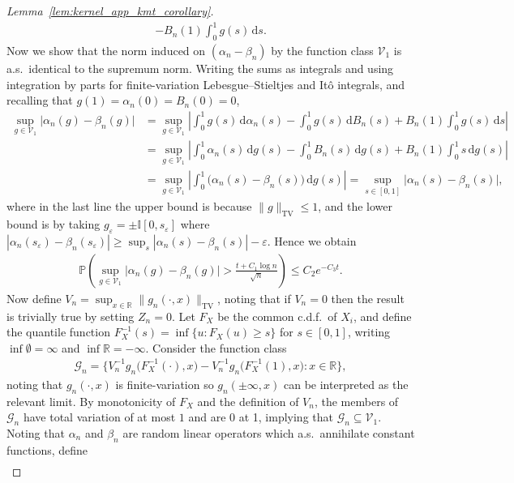 \documentclass[11pt,lof]{puthesis}
\renewcommand{\P}{\ensuremath{\mathbb{P}}}
\newcommand{\R}{\ensuremath{\mathbb{R}}}
\newcommand{\I}{\ensuremath{\mathbb{I}}}
\newcommand{\TV}{\mathrm{TV}}
\newcommand{\cG}{\ensuremath{\mathcal{G}}}
\newcommand{\cV}{\ensuremath{\mathcal{V}}}
\newcommand{\diff}[1]{\,\mathrm{d}#1}
\theoremstyle{break}
\theoremstyle{proof}
\newtheorem{proof}{Proof}
\begin{document}
\begin{proof}[Lemma~\ref{lem:kernel_app_kmt_corollary}]
\begin{align*}
- B_n(1) \int_0^1 g(s) \diff{s}.
\end{align*}
%
Now we show that the norm induced on
$(\alpha_n - \beta_n)$
by the function class $\cV_1$ is a.s.\ identical to the
supremum norm.
Writing the sums as integrals and using integration by parts
for finite-variation Lebesgue--Stieltjes and It\^o integrals,
and recalling that $g(1) = \alpha_n(0) = B_n(0) = 0$,
%
\begin{align*}
\sup_{g \in \cV_1}
\big|\alpha_n(g) - \beta_n(g)\big|
&=
\sup_{g \in \cV_1}
\left|
\int_0^1 g(s) \diff{\alpha_n(s)}
- \int_0^1 g(s) \diff{B_n(s)}
+ B_n(1) \int_0^1 g(s) \diff{s}
\right| \\
&=
\sup_{g \in \cV_1}
\left|
\int_0^1 \alpha_n(s) \diff{g(s)}
- \int_0^1 B_n(s) \diff{g(s)}
+ B_n(1) \int_0^1 s \diff{g(s)}
\right| \\
&=
\sup_{g \in \cV_1}
\left|
\int_0^1 \big(\alpha_n(s) - \beta_n(s)\big)
\diff{g(s)}
\right|
= \sup_{s \in [0,1]}
\big|
\alpha_n(s) - \beta_n(s)
\big|,
\end{align*}
%
where in the last line
the upper bound is because $\|g\|_\TV \leq 1$,
and the lower bound is by taking
$g_\varepsilon = \pm \I[0,s_\varepsilon]$ where
$|\alpha_n(s_\varepsilon) - \beta_n(s_\varepsilon)|
\geq \sup_s |\alpha_n(s) - \beta_n(s)| -
\varepsilon$.
Hence we obtain
%
\begin{align}
\label{eq:kernel_app_kmt_concentration}
\P\left(
\sup_{g \in \cV_1}
\big|\alpha_n(g) - \beta_n(g)\big|
> \frac{t + C_1\log n}{\sqrt{n}}
\right)
\leq C_2 e^{-C_3 t}.
\end{align}
%
Now define $V_n = \sup_{x \in \R} \|g_n(\cdot, x)\|_\TV$,
noting that if $V_n = 0$ then the result is trivially true
by setting $Z_n = 0$.
Let $F_X$ be the common c.d.f.\ of $X_i$,
and define the quantile function
$F_X^{-1}(s) = \inf \{u: F_X(u) \geq s\}$ for $s \in [0,1]$,
writing $\inf \emptyset = \infty$
and $\inf \R = -\infty$.
Consider the function class
%
\begin{align*}
\cG_n = \big\{
V_n^{-1} g_n\big(F_X^{-1}(\cdot), x\big)
- V_n^{-1} g_n\big(F_X^{-1}(1), x\big)
: x \in \R \big\},
\end{align*}
%
noting that $g_n(\cdot,x)$
is finite-variation so
$g_n(\pm \infty, x)$
can be interpreted as
the relevant limit.
By monotonicity of $F_X$ and the definition of $V_n$,
the members of $\cG_n$ have total variation of at most $1$
and are 0 at 1, implying that
$\cG_n \subseteq \cV_1$.
Noting that $\alpha_n$ and $\beta_n$ are random
linear operators which a.s.\ annihilate
constant functions,
define
%
\begin{align*}

\end{align*}
\end{proof}
\end{document}
